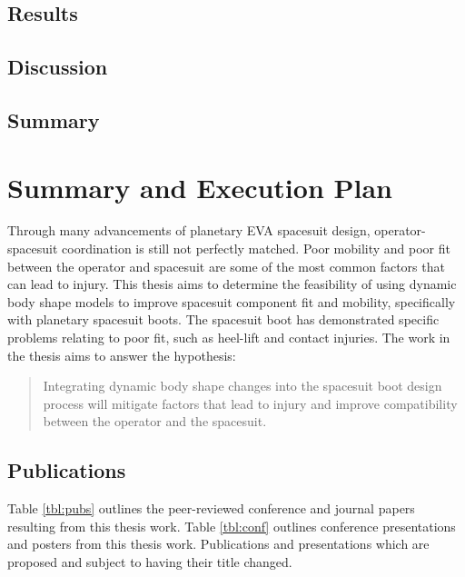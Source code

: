 \documentclass[defaultstyle,11pt]{thesis}
\begin{document}
\hypertarget{results-3}{%
\section{Results}\label{results-3}}

\hypertarget{discussion}{%
\section{Discussion}\label{discussion}}

\hypertarget{summary-6}{%
\section{Summary}\label{summary-6}}

\hypertarget{summary-and-execution-plan}{%
\chapter{Summary and Execution Plan}\label{summary-and-execution-plan}}

Through many advancements of planetary EVA spacesuit design, operator-spacesuit coordination is still not perfectly matched.
Poor mobility and poor fit between the operator and spacesuit are some of the most common factors that can lead to injury.
This thesis aims to determine the feasibility of using dynamic body shape models to improve spacesuit component fit and mobility, specifically with planetary spacesuit boots.
The spacesuit boot has demonstrated specific problems relating to poor fit, such as heel-lift and contact injuries.
The work in the thesis aims to answer the hypothesis:

\begin{quote}
Integrating dynamic body shape changes into the spacesuit boot design process will mitigate factors that lead to injury and improve compatibility between the operator and the spacesuit.
\end{quote}

\hypertarget{publications}{%
\section{Publications}\label{publications}}

Table \ref{tbl:pubs} outlines the peer-reviewed conference and journal papers resulting from this thesis work.
Table \ref{tbl:conf} outlines conference presentations and posters from this thesis work.
Publications and presentations which are proposed and subject to having their title changed.
\end{document}
